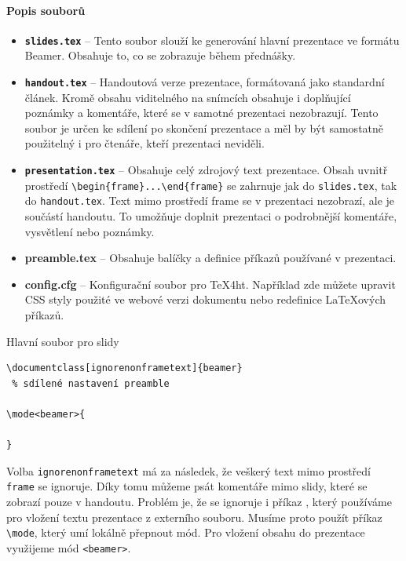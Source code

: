 \paragraph{Popis souborů}
\begin{itemize}

\item \textbf{\texttt{slides.tex}} – Tento soubor slouží ke generování hlavní prezentace ve formátu Beamer. Obsahuje to, co se zobrazuje během přednášky.

\item \textbf{\texttt{handout.tex}} – Handoutová verze prezentace, formátovaná
  jako standardní článek. Kromě obsahu viditelného na snímcích obsahuje i
  doplňující poznámky a komentáře, které se v samotné prezentaci nezobrazují.
  Tento soubor je určen ke sdílení po skončení prezentace a měl by být
  samostatně použitelný i pro čtenáře, kteří prezentaci neviděli.

\item \textbf{\texttt{presentation.tex}} – Obsahuje celý zdrojový text
  prezentace. Obsah uvnitř prostředí
  \verb|\begin|\verb|{frame}...\end|\verb|{frame}| se zahrnuje jak do
  \texttt{slides.tex}, tak do \texttt{handout.tex}. Text mimo prostředí frame
  se v prezentaci nezobrazí, ale je součástí handoutu. To umožňuje doplnit
  prezentaci o podrobnější komentáře, vysvětlení nebo poznámky.

\item \textbf{preamble.tex} – Obsahuje balíčky a definice příkazů používané v prezentaci.

\item \textbf{config.cfg} – Konfigurační soubor pro \TeX4ht. Například zde můžete upravit CSS styly použité ve webové verzi dokumentu nebo redefinice \LaTeX{}ových příkazů.
\end{itemize}

\begin{frame}[fragile]{Hlavní soubor pro slidy}
\begin{verbatim}
\documentclass[ignorenonframetext]{beamer}
 % sdílené nastavení preamble

\mode<beamer>{
  
}

\end{verbatim}
\end{frame}

Volba \texttt{ignorenonframetext} má za následek, že veškerý text mimo prostředí \texttt{frame} se ignoruje.
Díky tomu můžeme psát komentáře mimo slidy, které se zobrazí pouze v handoutu. Problém je, že se ignoruje i příkaz
\verb||, který používáme pro vložení textu prezentace z externího souboru. Musíme proto použít příkaz 
\verb|\|\verb|mode|, který umí lokálně přepnout mód. Pro vložení obsahu do prezentace využijeme mód \verb|<beamer>|.

